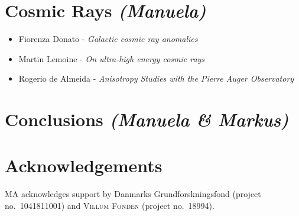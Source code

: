 \documentclass{PoS}
\begin{document}
\section{Cosmic Rays {\it (Manuela)}}

\begin{itemize}
\item Fiorenza Donato - {\it Galactic cosmic ray anomalies}
\item Martin Lemoine - {\it On ultra-high energy cosmic rays}
\item Rogerio de Almeida - {\it Anisotropy Studies with the Pierre Auger Observatory}
\end{itemize}

\section{Conclusions {\it (Manuela \& Markus)}}


\section*{Acknowledgements}
MA acknowledges support by Danmarks Grundforskningsfond (project no.~1041811001) and \textsc{Villum Fonden} (project no.~18994).



\end{document}
